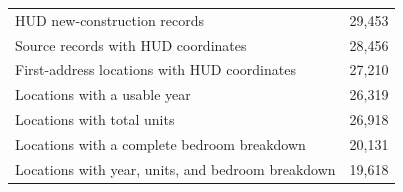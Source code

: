 \begin{tabular}{lr}
\hline
HUD new-construction records & 29,453 \\
Source records with HUD coordinates & 28,456 \\
First-address locations with HUD coordinates & 27,210 \\
Locations with a usable year & 26,319 \\
Locations with total units & 26,918 \\
Locations with a complete bedroom breakdown & 20,131 \\
Locations with year, units, and bedroom breakdown & 19,618 \\
\hline
\end{tabular}
